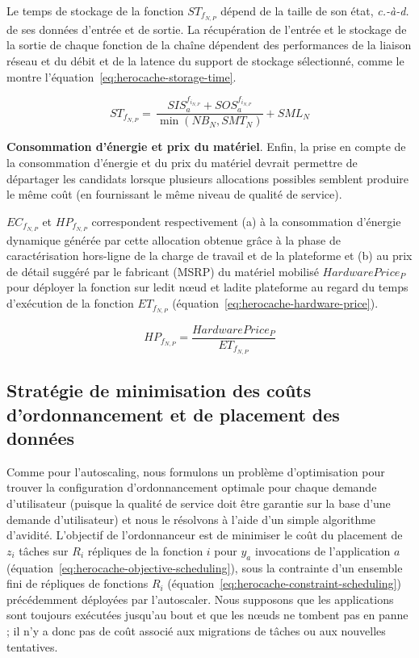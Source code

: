 Le temps de stockage de la fonction ${ST}_{{f}_{N, P}}$ dépend de la taille de son état, \textit{c.-à-d.} de ses données d'entrée et de sortie. La récupération de l'entrée et le stockage de la sortie de chaque fonction de la chaîne dépendent des performances de la liaison réseau et du débit et de la latence du support de stockage sélectionné, comme le montre l'équation~\ref{eq:herocache-storage-time}.

\begin{equation}
    {ST}_{{f}_{N, P}} = \, \frac{SIS_{a}^{f_{i_{N, P}}} + SOS_{a}^{f_{i_{N, P}}}}{\min (NB_{N}, SMT_{N})} + SML_{N}
\label{eq:herocache-storage-time}
\end{equation}

\textbf{Consommation d'énergie et prix du matériel}. Enfin, la prise en compte de la consommation d'énergie et du prix du matériel devrait permettre de départager les candidats lorsque plusieurs allocations possibles semblent produire le même coût (en fournissant le même niveau de qualité de service).

${EC}_{{f}_{N, P}}$ et ${HP}_{{f}_{N, P}}$ correspondent respectivement (a) à la consommation d'énergie dynamique générée par cette allocation obtenue grâce à la phase de caractérisation hors-ligne de la charge de travail et de la plateforme et (b) au prix de détail suggéré par le fabricant (MSRP) du matériel mobilisé $Hardware Price_{P}$ pour déployer la fonction sur ledit nœud et ladite plateforme au regard du temps d'exécution de la fonction $ET_{{f}_{N, P}}$ (équation~\ref{eq:herocache-hardware-price}).

\begin{equation}
    {HP}_{{f}_{N, P}} = \frac{Hardware Price_{P}}{ET_{{f}_{N, P}}}
\label{eq:herocache-hardware-price}
\end{equation}

\subsection{Stratégie de minimisation des coûts d'ordonnancement et de placement des données}

Comme pour l'autoscaling, nous formulons un problème d'optimisation pour trouver la configuration d'ordonnancement optimale pour chaque demande d'utilisateur (puisque la qualité de service doit être garantie sur la base d'une demande d'utilisateur) et nous le résolvons à l'aide d'un simple algorithme d'avidité. L'objectif de l'ordonnanceur est de minimiser le coût du placement de $z_i$ tâches sur $R_i$ répliques de la fonction $i$ pour $y_a$ invocations de l'application $a$ (équation~\ref{eq:herocache-objective-scheduling}), sous la contrainte d'un ensemble fini de répliques de fonctions $R_{i}$ (équation~\ref{eq:herocache-constraint-scheduling}) précédemment déployées par l'autoscaler. Nous supposons que les applications sont toujours exécutées jusqu'au bout et que les nœuds ne tombent pas en panne ; il n'y a donc pas de coût associé aux migrations de tâches ou aux nouvelles tentatives.

